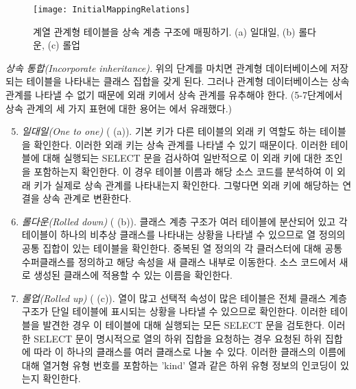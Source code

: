 \documentclass[a4paper,10pt,twoside]{book}
\begin{document}
\begin{figure}
\begin{center}
\texttt{[image: InitialMappingRelations]}
\caption{계열 관계형 테이블을 상속 계층 구조에 매핑하기. (a) 일대일, (b) 롤다운, (c) 롤업}
\end{center}
\end{figure}

\noindent
\emph{상속 통합(Incorporate inheritance).}
위의 단계를 마치면 관계형 데이터베이스에 저장되는 테이블을 나타내는 클래스 집합을 갖게 된다. 그러나 관계형 데이터베이스는 상속 관계를 나타낼 수 없기 때문에 외래 키에서 상속 관계를 유추해야 한다. (5-7단계에서 상속 관계의 세 가지 표현에 대한 용어는 \cite{Fros94a}에서 유래했다.)

\begin{enumerate}\setcounter{enumi}{4}
  \item \emph{일대일(One to one)} ( (a)). 기본 키가 다른 테이블의 외래 키 역할도 하는 테이블을 확인한다. 이러한 외래 키는 상속 관계를 나타낼 수 있기 때문이다. 이러한 테이블에 대해 실행되는 SELECT 문을 검사하여 일반적으로 이 외래 키에 대한 조인을 포함하는지 확인한다. 이 경우 테이블 이름과 해당 소스 코드를 분석하여 이 외래 키가 실제로 상속 관계를 나타내는지 확인한다. 그렇다면 외래 키에 해당하는 연결을 상속 관계로 변환한다.

  \item \emph{롤다운(Rolled down)} ( (b)). 클래스 계층 구조가 여러 테이블에 분산되어 있고 각 테이블이 하나의 비추상 클래스를 나타내는 상황을 나타낼 수 있으므로 열 정의의 공통 집합이 있는 테이블을 확인한다. 중복된 열 정의의 각 클러스터에 대해 공통 수퍼클래스를 정의하고 해당 속성을 새 클래스 내부로 이동한다. 소스 코드에서 새로 생성된 클래스에 적용할 수 있는 이름을 확인한다.

  \item \emph{롤업(Rolled up)} ( (c)). 열이 많고 선택적 속성이 많은 테이블은 전체 클래스 계층 구조가 단일 테이블에 표시되는 상황을 나타낼 수 있으므로 확인한다. 이러한 테이블을 발견한 경우 이 테이블에 대해 실행되는 모든 SELECT 문을 검토한다. 이러한 SELECT 문이 명시적으로 열의 하위 집합을 요청하는 경우 요청된 하위 집합에 따라 이 하나의 클래스를 여러 클래스로 나눌 수 있다. 이러한 클래스의 이름에 대해 열거형 유형 번호를 포함하는 'kind' 열과 같은 하위 유형 정보의 인코딩이 있는지 확인한다.

\end{enumerate}
\end{document}
